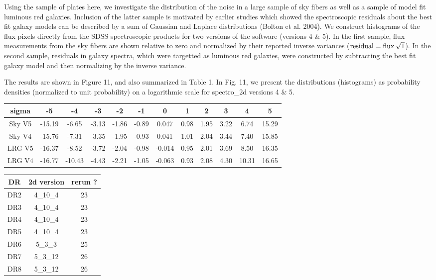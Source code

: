 \documentclass[12pt,preprint]{aastex}
\begin{document}
Using the sample of plates here, we investigate the distribution of the 
noise in a large sample of sky fibers as
well as a sample of model fit luminous red galaxies.  Inclusion of
the latter sample is motivated by earlier studies which showed 
the spectroscopic residuals about the best fit galaxy models 
can be described by a sum of Gaussian and Laplace 
distributions (Bolton et al. 2004).  We construct histograms of the flux
pixels directly from the SDSS spectroscopic products for two versions
of the software (versions 4 \& 5).  In the first sample, flux measurements
from the sky fibers are shown relative to zero and normalized by their reported
inverse variances 
(${\rm residual} = {\rm flux} \, \sqrt{\rm 1}$).  
In the second sample, residuals in galaxy spectra, 
which were targetted as luminous red galaxies, were constructed by subtracting
the best fit galaxy model and then normalizing by the inverse variance.

The results are shown in Figure 11, and also summarized in Table 1.
In Fig. 11, we present the distributions (histograms) as 
probability densities (normalized to unit probability) on a logarithmic 
scale for spectro\_2d versions 4 \& 5.   

\begin{table}
\begin{tabular}{cccccccccccc}
\hline
sigma &   -5   &  -4   &   -3  &   -2  &  -1   & 0 &  1   &  2 &  3   & 4 & 5 \\
\hline
\hline
Sky V5 & -15.19 & -6.65 & -3.13 & -1.86 & -0.89 &  0.047  & 0.98 &  1.95 &  3.22 &  6.74 & 15.29 \\
Sky V4 & -15.76 & -7.31 & -3.35 & -1.95 & -0.93 &  0.041  & 1.01 &  2.04 &  3.44 &  7.40 & 15.85 \\
LRG V5 & -16.37 & -8.52 & -3.72 & -2.04 & -0.98 & -0.014  & 0.95 &  2.01 &  3.69 &  8.50 & 16.35 \\
LRG V4 & -16.77 &-10.43 & -4.43 & -2.21 & -1.05 & -0.063  & 0.93 &  2.08 &  4.30 & 10.31 & 16.65 \\
\hline
\end{tabular}
\end{table}

\begin{table}
\begin{tabular}{ccc}
\hline
DR &  2d version & rerun ? \\
\hline
\hline
DR2 & 4\_10\_4  & 23 \\
DR3 & 4\_10\_4  & 23 \\
DR4 & 4\_10\_4  & 23 \\
DR5 & 4\_10\_4 & 23 \\
DR6 & 5\_3\_3  & 25 \\
DR7 & 5\_3\_12 & 26 \\
DR8 & 5\_3\_12 & 26 \\
\hline
\end{tabular}
\end{table}
\end{document}
